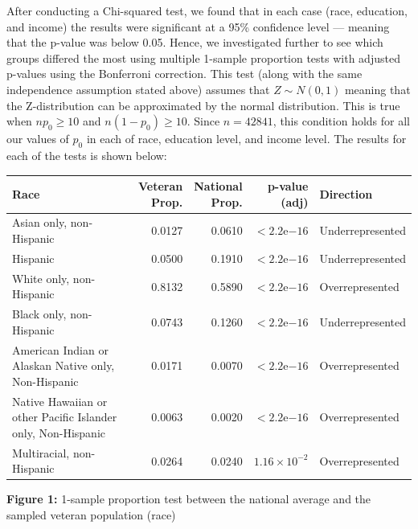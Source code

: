 \documentclass[
  10pt,
  letterpaper,
  DIV=11,
  numbers=noendperiod]{scrartcl}
\begin{document}
After conducting a Chi-squared test, we found that in each case (race,
education, and income) the results were significant at a 95\% confidence
level --- meaning that the p-value was below 0.05. Hence, we
investigated further to see which groups differed the most using
multiple 1-sample proportion tests with adjusted p-values using the
Bonferroni correction. This test (along with the same independence
assumption stated above) assumes that \(Z \sim N(0,1)\) meaning that the
Z-distribution can be approximated by the normal distribution. This is
true when \(np_0 \geq 10\) and \(n(1-p_0) \geq 10\). Since
\(n = 42841\), this condition holds for all our values of \(p_0\) in
each of race, education level, and income level. The results for each of
the tests is shown below:

\begin{table}[h]
\centering
\renewcommand{\arraystretch}{0.8}
\begin{tabular}{lrrrl}
\toprule
Race & \makecell{Veteran\\Prop.} & \makecell{National\\Prop.} & \makecell{p-value\\(adj)} & Direction \\
\midrule
Asian only, non-Hispanic & 0.0127 & 0.0610 & $< 2.2\mathrm{e}{-16}$ & Underrepresented \\
Hispanic & 0.0500 & 0.1910 & $< 2.2\mathrm{e}{-16}$ & Underrepresented \\
White only, non-Hispanic & 0.8132 & 0.5890 & $< 2.2\mathrm{e}{-16}$ & Overrepresented \\
Black only, non-Hispanic & 0.0743 & 0.1260 & $< 2.2\mathrm{e}{-16}$ & Underrepresented \\
American Indian or Alaskan Native only, Non-Hispanic & 0.0171 & 0.0070 & $< 2.2\mathrm{e}{-16}$ & Overrepresented \\
Native Hawaiian or other Pacific Islander only, Non-Hispanic & 0.0063 & 0.0020 & $< 2.2\mathrm{e}{-16}$ & Overrepresented \\
Multiracial, non-Hispanic & 0.0264 & 0.0240 & $1.16 \times 10^{-2}$ & Overrepresented \\
\bottomrule
\end{tabular}
\end{table}

\begin{center}

\textbf{Figure 1:} 1-sample proportion test between the national average and the sampled veteran population (race)

\end{center}
\end{document}
